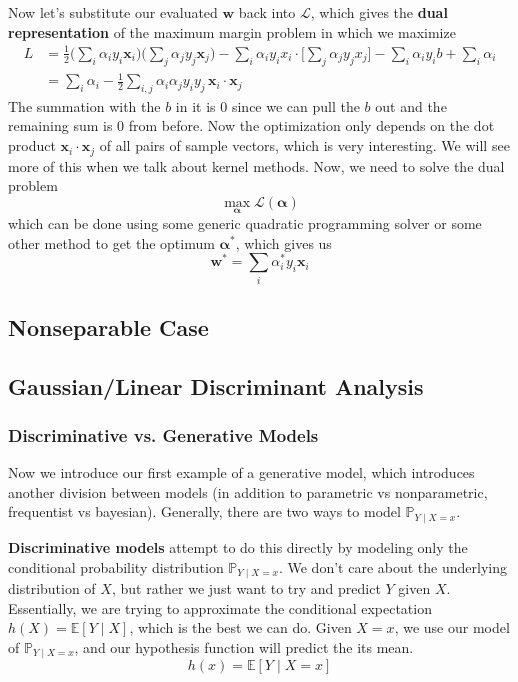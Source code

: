 \documentclass{article}
\begin{document}
      Now let's substitute our evaluated $\mathbf{w}$ back into $\mathcal{L}$, which gives the \textbf{dual representation} of the maximum margin problem in which we maximize  
      \begin{align*} 
          L & = \frac{1}{2} \bigg( \sum_i \alpha_i y_i \mathbf{x}_i \bigg) \bigg( \sum_j \alpha_j y_j \mathbf{x}_j \bigg) - \sum_{i} \alpha_i y_i x_i \cdot \bigg[ \sum_j \alpha_j y_j x_j \bigg] - \sum_i \alpha_i y_i b + \sum_i \alpha_i \\ 
            & = \sum_i \alpha_i - \frac{1}{2} \sum_{i, j} \alpha_i \alpha_j y_i y_j \, \mathbf{x}_i \cdot \mathbf{x}_j 
      \end{align*}
      The summation with the $b$ in it is $0$ since we can pull the $b$ out and the remaining sum is $0$ from before. Now the optimization only depends on the dot product $\mathbf{x}_i \cdot \mathbf{x}_j$ of all pairs of sample vectors, which is very interesting. We will see more of this when we talk about kernel methods. Now, we need to solve the dual problem 
      \[\max_{\boldsymbol{\alpha}} \mathcal{L}(\boldsymbol{\alpha})\]
      which can be done using some generic quadratic programming solver or some other method to get the optimum $\boldsymbol{\alpha}^\ast$, which gives us 
      \[\mathbf{w}^\ast = \sum_i \alpha_i^\ast y_i \mathbf{x}_i\]


    \subsection{Nonseparable Case} 

  \subsection{Gaussian/Linear Discriminant Analysis}

    \subsubsection{Discriminative vs. Generative Models}

      Now we introduce our first example of a generative model, which introduces another division between models (in addition to parametric vs nonparametric, frequentist vs bayesian). Generally, there are two ways to model $\mathbb{P}_{Y \mid X = x}$. 

      \begin{definition}
        \textbf{Discriminative models} attempt to do this directly by  modeling only the conditional probability distribution $\mathbb{P}_{Y \mid X = x}$. We don't care about the underlying distribution of $X$, but rather we just want to try and predict $Y$ given $X$. Essentially, we are trying to approximate the conditional expectation $h(X) = \mathbb{E}[Y \mid X]$, which is the best we can do. Given $X = x$, we use our model of $\mathbb{P}_{Y \mid X = x}$, and our hypothesis function will predict the its mean. 
        \begin{equation}
          h(x) = \mathbb{E}[Y \mid X = x]
        \end{equation}
      \end{definition}
\end{document}
